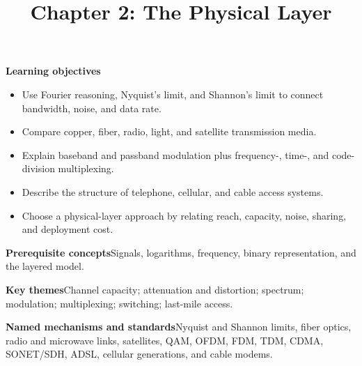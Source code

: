 \documentclass[10pt,letterpaper]{article}
\title{Chapter 2: The Physical Layer}
\author{}
\date{}
\begin{document}
\maketitle
{}
\begin{overviewbox}
\textbf{Learning objectives}\begin{itemize}
  \item Use Fourier reasoning, Nyquist's limit, and Shannon's limit to connect bandwidth, noise, and data rate.
  \item Compare copper, fiber, radio, light, and satellite transmission media.
  \item Explain baseband and passband modulation plus frequency-, time-, and code-division multiplexing.
  \item Describe the structure of telephone, cellular, and cable access systems.
  \item Choose a physical-layer approach by relating reach, capacity, noise, sharing, and deployment cost.
\end{itemize}
\textbf{Prerequisite concepts}\quad Signals, logarithms, frequency, binary representation, and the layered model.\par
\textbf{Key themes}\quad Channel capacity; attenuation and distortion; spectrum; modulation; multiplexing; switching; last-mile access.\par
\textbf{Named mechanisms and standards}\quad Nyquist and Shannon limits, fiber optics, radio and microwave links, satellites, QAM, OFDM, FDM, TDM, CDMA, SONET/SDH, ADSL, cellular generations, and cable modems.
\end{overviewbox}

\end{document}
